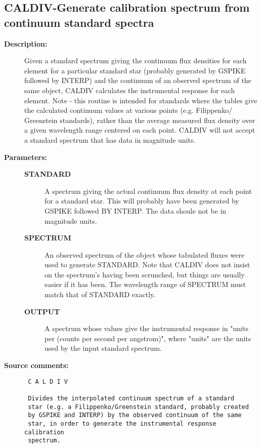 \subsection{CALDIV-\label{CALDIV}Generate calibration spectrum from continuum standard spectra}
\begin{description}

\item [{\bf Description:}]
 Given a standard spectrum giving the continuum flux densities
 for each element for a particular standard star (probably
 generated by GSPIKE followed by INTERP) and the continuum
 of an observed spectrum of the same object, CALDIV calculates
 the instrumental response for each element.  Note - this
 routine is intended for standards where the tables give the
 calculated continuum values at various points (e.g. Filippenko/
 Greenstein standards), rather than the average measured flux
 density over a given wavelength range centered on each point.
 CALDIV will not accept a standard spectrum that has data in
 magnitude units.

\item [{\bf Parameters:}]
\begin{description}
\item [{\bf STANDARD}]
 A spectrum giving the actual continuum flux density at each
 point for a standard star.  This will probably have been
 generated by GSPIKE followed BY INTERP.  The data shoule not
 be in magnitude units.
\item [{\bf SPECTRUM}]
 An observed spectrum of the object whose tabulated fluxes
 were used to generate STANDARD.  Note that CALDIV does not
 insist on the spectrum's having been scrunched, but things
 are usually easier if it has been.  The wavelength range of
 SPECTRUM must match that of STANDARD exactly.
\item [{\bf OUTPUT}]
 A spectrum whose values give the instrumental response in
 "units per (counts per second per angstrom)", where "units"
 are the units used by the input standard spectrum.
\end{description}

\item [{\bf Source comments:}]
\begin{verbatim}
 C A L D I V

 Divides the interpolated continuum spectrum of a standard
 star (e.g. a Filippenko/Greenstein standard, probably created
 by GSPIKE and INTERP) by the observed continuum of the same
 star, in order to generate the instrumental response calibration
 spectrum.


\end{verbatim}
\end{description}
